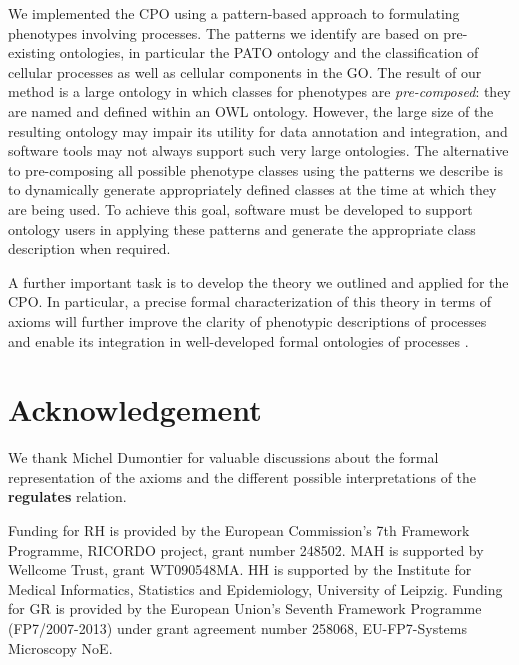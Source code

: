 \documentclass{bioinfo}
\renewcommand{\cite}{\citep}
\begin{document}
We implemented the CPO using a pattern-based approach to formulating
phenotypes involving processes. The patterns we identify are based on
pre-existing ontologies, in particular the PATO ontology and the
classification of cellular processes as well as cellular components in
the GO. The result of our method is a large ontology in which classes
for phenotypes are {\em pre-composed}: they are named and defined
within an OWL ontology. However, the large size of the resulting
ontology may impair its utility for data annotation and integration,
and software tools may not always support such very large
ontologies. The alternative to pre-composing all possible phenotype
classes using the patterns we describe is to dynamically generate
appropriately defined classes at the time at which they are being
used. To achieve this goal, software must be developed to support
ontology users in applying these patterns and generate the appropriate
class description when required.

A further important task is to develop the theory we outlined and
applied for the CPO. In particular, a precise formal characterization
of this theory in terms of axioms will further improve the clarity of
phenotypic descriptions of processes and enable its integration in
well-developed formal ontologies of processes \cite{Herre2006,
  Gruninger2010}.

\section{Acknowledgement}
We thank Michel Dumontier for valuable discussions about the formal
representation of the axioms and the different possible
interpretations of the {\bf regulates} relation.

Funding for RH is provided by the European Commission's 7th Framework
Programme, RICORDO project, grant number 248502. MAH is supported by
Wellcome Trust, grant WT090548MA. HH is supported by the Institute for
Medical Informatics, Statistics and Epidemiology, University of
Leipzig.  Funding for GR is provided by the European Union's Seventh
Framework Programme (FP7/2007-2013) under grant agreement number
258068, EU-FP7-Systems Microscopy NoE. 
\end{document}
